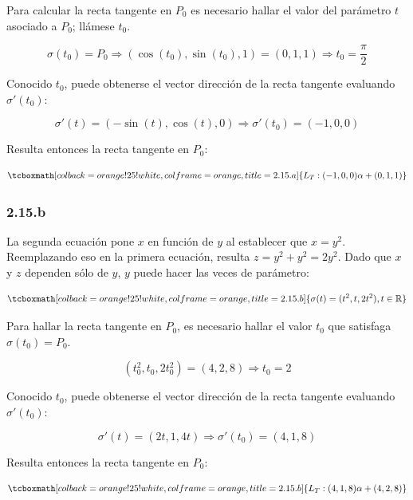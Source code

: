 \documentclass{article}
\renewcommand{\Bbb}{\mathbb}
\begin{document}
Para calcular la recta tangente en $P_0$ es necesario hallar el valor del parámetro $t$ asociado a $P_0$; llámese $t_0$.

\begin{equation}
\sigma(t_0) = P_0 \Rightarrow (\cos(t_0), \sin(t_0), 1) = (0, 1, 1) \Rightarrow t_0 = \frac{\pi}{2}
\end{equation}

Conocido $t_0$, puede obtenerse el vector dirección de la recta tangente evaluando $\sigma'(t_0)$:

\begin{equation}
\sigma'(t) = (-\sin(t), \cos(t), 0) \Rightarrow \sigma'(t_0) = (-1, 0, 0)
\end{equation}

Resulta entonces la recta tangente en $P_0$:

\begin{equation}
\tcboxmath[colback=orange!25!white,colframe=orange,title=2.15.a]
{
L_T: (-1, 0, 0) \alpha + (0, 1, 1)
}
\end{equation}

\subsubsection*{2.15.b}
\label{subsubsec:2.15.b}

La segunda ecuación pone $x$ en función de $y$ al establecer que $x = y^2$. Reemplazando eso en la primera ecuación, resulta $z = y^2 + y^2 = 2y^2$. Dado que $x$ y $z$ dependen sólo de $y$, $y$ puede hacer las veces de parámetro:

\begin{equation}
\tcboxmath[colback=orange!25!white,colframe=orange,title=2.15.b]
{
\sigma(t) = (t^2, t, 2t^2), t \in \Bbb R
}
\end{equation}

Para hallar la recta tangente en $P_0$, es necesario hallar el valor $t_0$ que satisfaga $\sigma(t_0) = P_0$.

\begin{equation}
(t_0^2, t_0, 2t_0^2) = (4, 2, 8) \Rightarrow t_0 = 2
\end{equation}

Conocido $t_0$, puede obtenerse el vector dirección de la recta tangente evaluando $\sigma'(t_0)$:

\begin{equation}
\sigma'(t) = (2t, 1, 4t) \Rightarrow \sigma'(t_0) = (4, 1, 8)
\end{equation}

Resulta entonces la recta tangente en $P_0$:

\begin{equation}
\tcboxmath[colback=orange!25!white,colframe=orange,title=2.15.b]
{
L_T: (4, 1, 8) \alpha + (4, 2, 8)
}
\end{equation}
\end{document}
